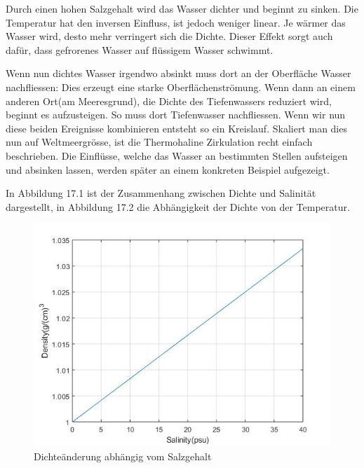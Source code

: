 Durch einen hohen Salzgehalt wird das Wasser dichter und beginnt zu sinken. Die Temperatur hat den inversen Einfluss, ist jedoch weniger linear. Je wärmer das Wasser wird, desto mehr verringert sich die Dichte. Dieser Effekt sorgt auch dafür, dass gefrorenes Wasser auf flüssigem Wasser schwimmt.

Wenn nun dichtes Wasser irgendwo absinkt muss dort an der Oberfläche Wasser nachfliessen: Dies erzeugt eine starke Oberflächenströmung. Wenn dann an einem anderen Ort(am Meeresgrund), die Dichte des Tiefenwassers reduziert wird, beginnt es aufzusteigen. So muss dort Tiefenwasser nachfliessen. Wenn wir nun diese beiden Ereignisse kombinieren entsteht so ein Kreislauf. Skaliert man dies nun auf Weltmeergrösse, ist die Thermohaline Zirkulation recht einfach beschrieben. Die Einflüsse, welche das Wasser an bestimmten Stellen aufsteigen und absinken lassen, werden später an einem konkreten Beispiel aufgezeigt.

In Abbildung 17.1 ist der Zusammenhang zwischen Dichte und Salinität dargestellt, in Abbildung 17.2 die Abhängigkeit der Dichte von der Temperatur.


\begin{figure}
	\centering
\includegraphics[width=12cm]{thermohalin/Code/graphs/graph_salinity.jpg}
\caption{Dichteänderung abhängig vom Salzgehalt}
\end{figure}

